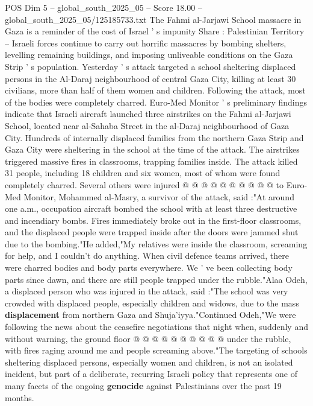 \begin{textsample}{POS Dim 5 – global\_south\_2025\_05 – Score 18.00 – global\_south\_2025\_05/125185733.txt}  \label{ex:f5_pos_116}
The Fahmi al-Jarjawi School massacre in Gaza is a reminder of the cost of Israel ' s impunity Share : Palestinian Territory -- Israeli forces continue to carry out horrific massacres by bombing shelters, levelling remaining buildings, and imposing unliveable conditions on the Gaza Strip ' s population.
Yesterday ' s attack targeted a school sheltering displaced persons in the Al-Daraj neighbourhood of central Gaza City, killing at least 30 civilians, more than half of them women and children.
Following the attack, most of the bodies were completely charred.
Euro-Med Monitor ' s preliminary findings indicate that Israeli aircraft launched three airstrikes on the Fahmi al-Jarjawi School, located near al-Sahaba Street in the al-Daraj neighbourhood of Gaza City.
Hundreds of internally displaced families from the northern Gaza Strip and Gaza City were sheltering in the school at the time of the attack.
The airstrikes triggered massive fires in classrooms, trapping families inside.
The attack killed 31 people, including 18 children and six women, most of whom were found completely charred.
Several others were injured @ @ @ @ @ @ @ @ @ @ to Euro-Med Monitor, Mohammed al-Masry, a survivor of the attack, said :"At around one a.m., occupation aircraft bombed the school with at least three destructive and incendiary bombs.
Fires immediately broke out in the first-floor classrooms, and the displaced people were trapped inside after the doors were jammed shut due to the bombing."He added,"My relatives were inside the classroom, screaming for help, and I couldn't do anything.
When civil defence teams arrived, there were charred bodies and body parts everywhere.
We ' ve been collecting body parts since dawn, and there are still people trapped under the rubble."Alaa Odeh, a displaced person who was injured in the attack, said :"The school was very crowded with displaced people, especially children and widows, due to the mass \textbf{displacement} from northern Gaza and Shuja'iyya."Continued Odeh,"We were following the news about the ceasefire negotiations that night when, suddenly and without warning, the ground floor @ @ @ @ @ @ @ @ @ @ under the rubble, with fires raging around me and people screaming above."The targeting of schools sheltering displaced persons, especially women and children, is not an isolated incident, but part of a deliberate, recurring Israeli policy that represents one of many facets of the ongoing \textbf{genocide} against Palestinians over the past 19 months.

\end{textsample}
